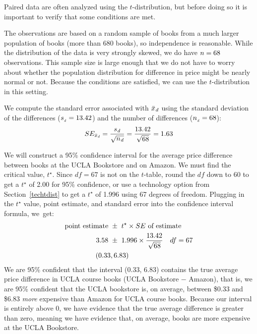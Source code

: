 Paired data are often analyzed using the $t$-distribution, but before doing so it is important to verify that some conditions are met.

The observations are based on a random sample of books from a much larger population of books (more than 680 books),
so independence is reasonable.
While the distribution of the data is very strongly skewed,
we do have $n = 68{}$ observations.  This sample size is large enough that we do not have to worry about whether the population distribution for difference in price might be nearly normal or not.
Because the conditions are satisfied,
we can use the $t$-distribution in this setting.


We compute the standard error associated with
$\bar{x}_{\text{\emph{d}}}$ using the standard
deviation of the differences
($s_{_{\text{\emph{d}}}} = 13.42{}$)
and the number of differences
($n_{_{\text{\emph{d}}}} = 68{}$):
\begin{align*}
SE_{\bar{x}_{\text{\emph{d}}}}
  = \frac{s_{\text{\emph{d}}}}{\sqrt{n_{\text{\emph{d}}}}}
  = \frac{13.42{}}{\sqrt{68{}}} = 1.63{}
\end{align*}

We will construct a 95\% confidence interval for the average price difference between books at the UCLA Bookstore and on Amazon. We must find the critical value, $t^{\star}$. Since $df = 67$ is not on the $t$-table, round the $df$ down to 60 to get a $t^{\star}$ of 2.00 for 95\% confidence, or use a technology option from Section~\ref{techtdist} to get a $t^{\star}$ of 1.996 using 67 degrees of freedom.  Plugging in the $t^{\star}$ value, point estimate, and standard error into the confidence interval formula, we~get:
\begin{align*}
\text{point estimate} \ &\pm\ t^{\star}\times SE\ \text{of estimate}\\
      3.58{} \ &\pm\ 1.996 \times \frac{13.42{}}{\sqrt{68{}}} \quad df=67 \\
      (0.33&,  6.83)
\end{align*}
We are 95\% confident that the interval (0.33, 6.83) contains the true average price difference in UCLA course books (UCLA Bookstore $-$ Amazon), that is, we are 95\% confident that the UCLA bookstore is, on average, between \$0.33 and \$6.83 \emph{more} expensive than Amazon for UCLA course books. Because our interval is entirely above 0, we have evidence that the true average difference is greater than zero, meaning we have evidence that, on average, books are more expensive at the UCLA Bookstore. 

